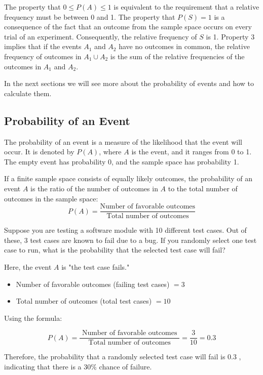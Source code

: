 The property that \( 0 \leq P(A) \leq 1 \) is equivalent to the requirement that a relative frequency must be between 0 and 1. The property that \( P(S) = 1 \) is a consequence of the fact that an outcome from the sample space occurs on every trial of an experiment. Consequently, the relative frequency of \( S \) is 1. Property 3 implies that if the events \( A_1 \) and \( A_2 \) have no outcomes in common, the relative frequency of outcomes in \( A_1 \cup A_2 \) is the sum of the relative frequencies of the outcomes in \( A_1 \) and \( A_2 \).

In the next sections we will see more about the probability of events and how to calculate them.

\subsection*{Probability of an Event}
The probability of an event is a measure of the likelihood that the event will occur. It is denoted by \( P(A) \), where \( A \) is the event, and it ranges from 0 to 1. The empty event has probability 0, and the sample space has probability 1.

\begin{definition}
    If a finite sample space consists of equally likely outcomes, the probability of an event \( A \) is the ratio of the number of outcomes in \(A\) to the total number of outcomes in the sample space:
    \[
    P(A) = \frac{\text{Number of favorable outcomes}}{\text{Total number of outcomes}}
    \]
\end{definition}

\begin{example}
    Suppose you are testing a software module with 10 different test cases. Out of these, 3 test cases are known to fail due to a bug. If you randomly select one test case to run, what is the probability that the selected test case will fail?
\end{example}

\begin{solution}
    Here, the event $A$ is "the test case fails."
\begin{itemize}
    \item Number of favorable outcomes (failing test cases) $=3$
    \item Total number of outcomes (total test cases) $=10$
\end{itemize}

Using the formula:

$$
P(A)=\frac{\text { Number of favorable outcomes }}{\text { Total number of outcomes }}=\frac{3}{10}=0.3
$$


Therefore, the probability that a randomly selected test case will fail is 0.3 , indicating that there is a $30 \%$ chance of failure.

\end{solution}

